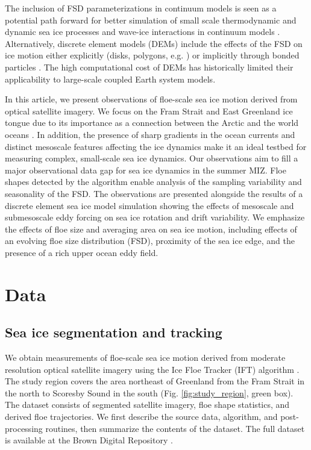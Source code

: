 \documentclass[aog]{igs}
\begin{document}
The inclusion of FSD parameterizations in continuum models is seen as a potential path forward for better simulation of small scale thermodynamic and dynamic sea ice processes and wave-ice interactions in continuum models \citep{zhang2015_SeaIce,horvat2015_PrognosticModel, roach2018_EmergentSea, bateson2020_ImpactSea}.
Alternatively, discrete element models (DEMs) include the effects of the FSD on ice motion either explicitly (disks, polygons, e.g. \cite{gupta2024_EddyInducedDispersion, damsgaard2018_ApplicationDiscrete, brenner2023_ScaleDependentAirSea,manucharyan2022_SubZeroSea}) or implicitly through bonded particles \citep{astromHighResolutionFractureDynamics2024}.
The high computational cost of DEMs has historically limited their applicability to large-scale coupled Earth system models.

In this article, we present observations of floe-scale sea ice motion derived from optical satellite imagery. We focus on the Fram Strait and East Greenland ice tongue due to its importance as a connection between the Arctic and the world oceans \citep{smedsrud2017_FramStrait, sumata2022_UnprecedentedDecline}. 
In addition, the presence of sharp gradients in the ocean currents and distinct mesoscale features affecting the ice dynamics \citep{manley1987_EffectsSub, kozlov2021_EddiesMarginal, morozov2023_EddiesArctic, watkins2023_EvidenceAbrupt} make it an ideal testbed for measuring complex, small-scale sea ice dynamics.
Our observations aim to fill a major observational data gap for sea ice dynamics in the summer MIZ.
Floe shapes detected by the algorithm enable analysis of the sampling variability and seasonality of the FSD.
The observations are presented alongside the results of a discrete element sea ice model simulation showing the effects of mesoscale and submesoscale eddy forcing on sea ice rotation and drift variability.
We emphasize the effects of floe size and averaging area on sea ice motion, including effects of an evolving floe size distribution (FSD), proximity of the sea ice edge, and the presence of a rich upper ocean eddy field.

\section{Data}
\subsection{Sea ice segmentation and tracking}
We obtain measurements of floe-scale sea ice motion derived from moderate resolution optical satellite imagery using the Ice Floe Tracker (IFT) algorithm \citep{lopez-acosta2019_IceFloe}. The study region covers the area northeast of Greenland from the Fram Strait in the north to Scoresby Sound in the south (Fig. \ref{fig:study_region}, green box). The dataset consists of segmented satellite imagery, floe shape statistics, and derived floe trajectories. We first describe the source data, algorithm, and post-processing routines, then summarize the contents of the dataset. The full dataset is available at the Brown Digital Repository \citep{lopez-acosta2024_FramStrait}.
\end{document}
